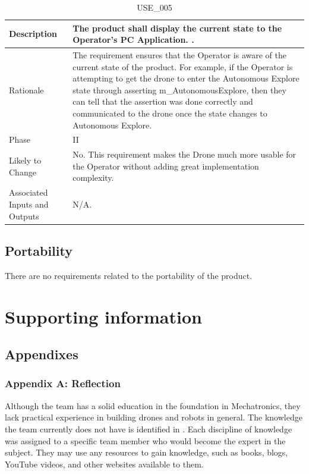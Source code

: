 \documentclass{article}
\begin{document}
\begin{table}[!h]
\begin{center}
\caption {USE\_005} 
\label{USE_005}
\begin{tabular}{ | m{3cm} | m{11cm} | }
\hline
Description & The product shall display the current state to the Operator's PC Application. \nameref{sec:Assumptions}. \\
\hline
Rationale & The requirement ensures that the Operator is aware of the current state of the product. For example, if the Operator is attempting to get the drone to enter the Autonomous Explore state through asserting m_AutonomousExplore, then they can tell that the assertion was done correctly and communicated to the drone once the state changes to Autonomous Explore. \\
\hline
Phase & II \\
\hline
Likely to Change & No. This requirement makes the Drone much more usable for the Operator without adding great implementation complexity. \\
\hline
Associated Inputs and Outputs & N/A.  \\
\hline
\end{tabular}
\end{center}
\end{table}
\clearpage
\newpage

\subsection{ Portability}
There are no requirements related to the portability of the product.

\section{Supporting information}
\subsection{Appendixes}
\label{appendix}
\subsubsection{Appendix A: Reflection}
\label{appendixa}
Although the team has a solid education in the foundation in Mechatronics, they lack practical experience in building drones and robots in general. The knowledge the team currently does not have is identified in . Each discipline of knowledge was assigned to a specific team member who would become the expert in the subject. They may use any resources to gain knowledge, such as books, blogs, YouTube videos, and other websites available to them. 
\end{document}
